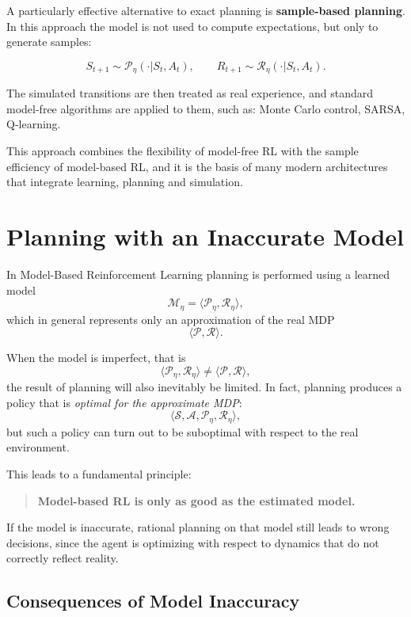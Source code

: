 A particularly effective alternative to exact planning is \textbf{sample-based planning}.
In this approach the model is not used to compute expectations, but only to generate samples:

\[
S_{t+1} \sim \mathcal{P}_\eta(\cdot | S_t, A_t),
\qquad
R_{t+1} \sim \mathcal{R}_\eta(\cdot | S_t, A_t).
\]

The simulated transitions are then treated as real experience,
and standard model-free algorithms are applied to them, such as:
Monte Carlo control, SARSA, Q-learning.

This approach combines the flexibility of model-free RL
with the sample efficiency of model-based RL,
and it is the basis of many modern architectures that integrate learning, planning and simulation.

\section{Planning with an Inaccurate Model}

In Model-Based Reinforcement Learning planning is performed using a learned model
\[
\mathcal{M}_\eta = \langle \mathcal{P}_\eta, \mathcal{R}_\eta \rangle,
\]
which in general represents only an approximation of the real MDP
\[
\langle \mathcal{P}, \mathcal{R} \rangle.
\]

When the model is imperfect, that is
\[
\langle \mathcal{P}_\eta, \mathcal{R}_\eta \rangle \neq \langle \mathcal{P}, \mathcal{R} \rangle,
\]
the result of planning will also inevitably be limited.
In fact, planning produces a policy that is \emph{optimal for the approximate MDP}:
\[
\langle \mathcal{S}, \mathcal{A}, \mathcal{P}_\eta, \mathcal{R}_\eta \rangle,
\]
but such a policy can turn out to be suboptimal with respect to the real environment.

This leads to a fundamental principle:
\begin{quote}
\textbf{Model-based RL is only as good as the estimated model.}
\end{quote}

If the model is inaccurate, rational planning on that model still leads to wrong decisions,
since the agent is optimizing with respect to dynamics that do not correctly reflect reality.

\subsection{Consequences of Model Inaccuracy}

